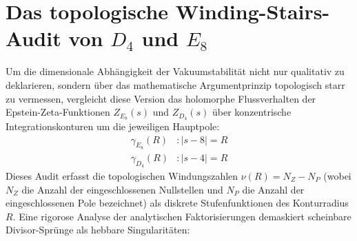 \documentclass[11pt,a4paper]{article}
\begin{document}
	\section{Das topologische Winding-Stairs-Audit von $D_4$ und $E_8$}
	Um die dimensionale Abhängigkeit der Vakuumstabilität nicht nur qualitativ zu deklarieren, sondern über das mathematische Argumentprinzip topologisch starr zu vermessen, vergleicht diese Version das holomorphe Flussverhalten der Epstein-Zeta-Funktionen $Z_{E_8}(s)$ und $Z_{D_4}(s)$ über konzentrische Integrationskonturen um die jeweiligen Hauptpole:
	\begin{align}
		\gamma_{E_8}(R) &: |s - 8| = R \\
		\gamma_{D_4}(R) &: |s - 4| = R
	\end{align}
	Dieses Audit erfasst die topologischen Windungszahlen $\nu(R) = N_Z - N_P$ (wobei $N_Z$ die Anzahl der eingeschlossenen Nullstellen und $N_P$ die Anzahl der eingeschlossenen Pole bezeichnet) als diskrete Stufenfunktionen des Konturradius $R$. Eine rigorose Analyse der analytischen Faktorisierungen demaskiert scheinbare Divisor-Sprünge als hebbare Singularitäten:
	
\end{document}
